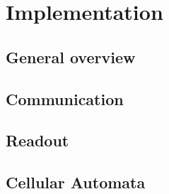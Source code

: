 
\chapter{Implementation}

\section{General overview}

\section{Communication}

\section{Readout}

\section{Cellular Automata}


\cleardoublepage